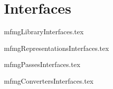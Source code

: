 



\part{Interfaces}

{mfmgLibraryInterfaces.tex}

{mfmgRepresentationsInterfaces.tex}

{mfmgPassesInterfaces.tex}

{mfmgConvertersInterfaces.tex}
